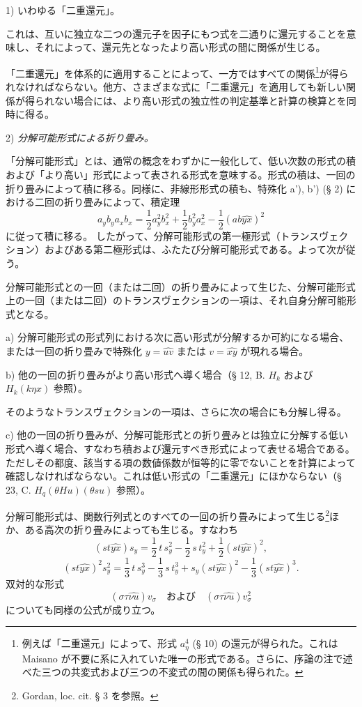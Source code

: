 \documentclass[11pt]{jlreq}
\begin{document}
1) いわゆる「二重還元」。

これは、互いに独立な二つの還元子を因子にもつ式を二通りに還元することを意味し、それによって、還元先となったより高い形式の間に関係が生じる。

「二重還元」を体系的に適用することによって、一方ではすべての関係\footnote{例えば「二重還元」によって、形式 $a_\eta^4$ (§ 10) の還元が得られた。これは Maisano が不要に系に入れていた唯一の形式である。さらに、序論の注で述べた三つの共変式および三つの不変式の間の関係も得られた。}が得られなければならない。他方、さまざまな式に「二重還元」を適用しても新しい関係が得られない場合には、より高い形式の独立性の判定基準と計算の検算とを同時に得る。

2) \emph{分解可能形式による折り畳み。}

「分解可能形式」とは、通常の概念をわずかに一般化して、低い次数の形式の積および「より高い」形式によって表される形式を意味する。形式の積は、一回の折り畳みによって積に移る。同様に、非線形形式の積も、特殊化 a'), b') (§ 2) における二回の折り畳みによって、積定理
\[
a_yb_y a_xb_x=\frac12a_y^2b_x^2+\frac12b_y^2a_x^2-\frac12(ab\widehat{yx})^2
\]
に従って積に移る。
したがって、分解可能形式の第一極形式（トランスヴェクション）およびある第二極形式は、ふたたび分解可能形式である。よって次が従う。

分解可能形式との一回（または二回）の折り畳みによって生じた、分解可能形式上の一回（または二回）のトランスヴェクションの一項は、それ自身分解可能形式となる。

a) 分解可能形式の形式列における次に高い形式が分解するか可約になる場合、または一回の折り畳みで特殊化 $y=\widehat{uv}$ または $v=\widehat{xy}$ が現れる場合。

b) 他の一回の折り畳みがより高い形式へ導く場合（§ 12, B. $H_k$ および $H_k(k\eta x)$ 参照）。

そのようなトランスヴェクションの一項は、さらに次の場合にも分解し得る。

c) 他の一回の折り畳みが、分解可能形式との折り畳みとは独立に分解する低い形式へ導く場合、すなわち積および還元すべき形式によって表せる場合である。ただしその都度、該当する項の数値係数が恒等的に零でないことを計算によって確認しなければならない。これは低い形式の「二重還元」にほかならない（§ 23, C. $H_q(\theta H u)(\theta s u)$ 参照）。

分解可能形式は、関数行列式とのすべての一回の折り畳みによって生じる\footnote{Gordan, loc. cit. § 3 を参照。}ほか、ある高次の折り畳みによっても生じる。すなわち
\[
(st\widehat{yx})s_y=\frac12\,t\,s_y^2-\frac12\,s\,t_y^2+\frac12(st\widehat{yx})^2,
\]
\[
(st\widehat{yx})^2s_y^2=\frac13\,t\,s_y^3-\frac13\,s\,t_y^3+s_y(st\widehat{yx})^2-\frac13(st\widehat{yx})^3.
\]
双対的な形式
\[
(\sigma\tau\widehat{\nu u})v_\sigma
\quad\text{および}\quad
(\sigma\tau\widehat{\nu u})v_\sigma^2
\]
についても同様の公式が成り立つ。
\end{document}
